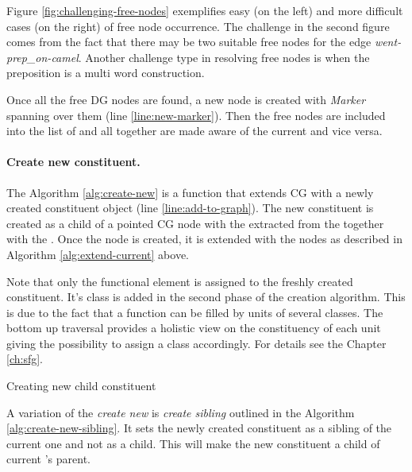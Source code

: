 Figure \ref{fig:challenging-free-nodes} exemplifies easy (on the left) and more difficult cases (on the right) of free node occurrence. The challenge in the second figure comes from the fact that there may be two suitable free nodes for the edge \textit{went-prep\_on-camel}. Another challenge type in resolving free nodes is when the preposition is a multi word construction. 

Once all the free DG nodes are found, a new \cg node is created with \textit{Marker} \elementType spanning over them (line \ref{line:new-marker}). Then the free nodes are included into the list of \Children and all together are made aware of the current \cgPointer and vice versa. 

\paragraph{Create new constituent.} The Algorithm \ref{alg:create-new} is a function that extends CG with a newly created constituent object (line \ref{line:add-to-graph}). The new constituent is created as a child of a pointed CG node with the \elementType extracted from the \rt together with the \operation. Once the \cg node is created, it is extended with the \Children nodes as described in Algorithm \ref{alg:extend-current} above.

Note that only the functional element is assigned to the freshly created constituent. It's class is added in the second phase of the creation algorithm. This is due to the fact that a function can be filled by units of several classes. The bottom up traversal provides a holistic view on the constituency of each unit giving the possibility to assign a class accordingly. For details see the Chapter \ref{ch:sfg}.

\begin{algorithm}[H]
\Input { \cgPointer, \Children, \elementType, \edge, \dg, \cg}
	\caption{Creating new child constituent}
	\label{alg:create-new}
\end{algorithm}

A variation of the \textit{create new} is \textit{create sibling}  outlined in the Algorithm \ref{alg:create-new-sibling}. It sets the newly created constituent as a sibling of the current one and not as a child. This will make the new constituent a child of current \cgPointer's parent.


